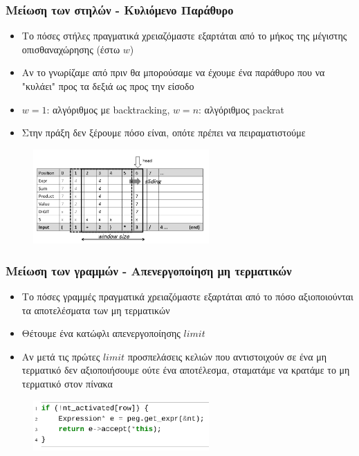 \documentclass{beamer}
\begin{document}
\begin{frame}
  \frametitle{Μείωση των στηλών - Κυλιόμενο Παράθυρο}

	\begin{itemize}
	  \item Το πόσες στήλες πραγματικά χρειαζόμαστε εξαρτάται από το μήκος της μέγιστης οπισθαναχώρησης (έστω $w$)
	  \item Αν το γνωρίζαμε από πριν θα μπορούσαμε να έχουμε ένα παράθυρο που να "κυλάει" προς τα δεξιά ως προς την είσοδο \pause
	  \item $w = 1$: αλγόριθμος με backtracking, $w = n$: αλγόριθμος packrat \pause
	  \item Στην πράξη δεν ξέρουμε πόσο είναι, οπότε πρέπει να πειραματιστούμε \pause
	\end{itemize}

\begin{figure}[h]
    \centering
	\includegraphics[width=0.60\textwidth]{../transcript/pics/slide_window}
\end{figure} 
\end{frame}

\begin{frame}
  \frametitle{Μείωση των γραμμών - Απενεργοποίηση μη τερματικών}

	\begin{itemize}
	  \item Το πόσες γραμμές πραγματικά χρειαζόμαστε εξαρτάται από το πόσο αξιοποιούνται τα αποτελέσματα των μη τερματικών
	  \item Θέτουμε ένα κατώφλι απενεργοποίησης $limit$
	  \item Αν μετά τις πρώτες $limit$ προσπελάσεις κελιών που αντιστοιχούν σε ένα μη τερματικό δεν αξιοποιήσουμε ούτε ένα αποτέλεσμα, σταματάμε να κρατάμε το μη τερματικό στον πίνακα
	\end{itemize}

\begin{figure}[h]
    \centering
	\includegraphics[width=0.60\textwidth]{pics/deactivated}
\end{figure} 
\end{frame}
\end{document}
